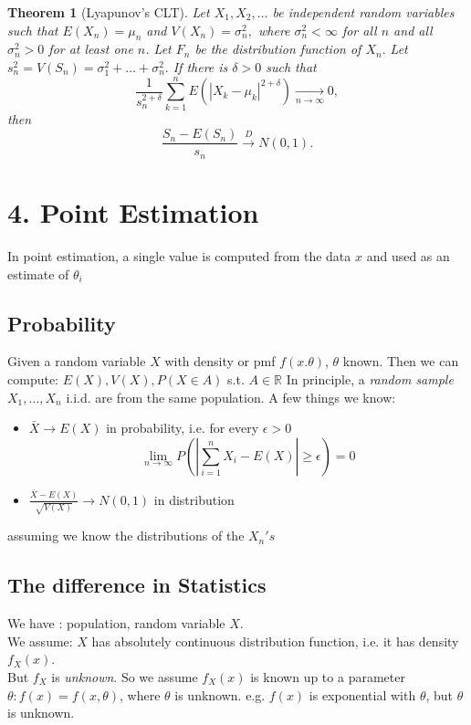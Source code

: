 \documentclass[12pt]{report} \addtolength{\textheight}{2in}
\newtheorem{thm}{Theorem}
\newcommand{\dto}{\overset{D}{\longrightarrow}}
\newcommand{\ntends}{\underset{n\to\infty}{\longrightarrow}}
\begin{document}
\begin{thm}[Lyapunov's CLT]
Let $X_1,X_2,\dots$ be independent random variables such that $E(X_n)=\mu_n$ and $V(X_n)=\sigma^2_n,$ where $\sigma^2_n < \infty$ for all $n$ and all $\sigma^2_n > 0$ for at least one $n$. Let $F_n$ be the distribution function of $X_n.$ Let $s_n^2=V(S_n)=\sigma^2_1+\dots+\sigma^2_n.$ If there is $\delta > 0$ such that 
\begin{displaymath}
\frac{1}{s_n^{2+\delta}}\sum_{k=1}^{n} E(|X_k-\mu_k|^{2+\delta}) \ntends 0,
\end{displaymath}
then
\begin{displaymath}
\frac{S_n-E(S_n)}{s_n}\dto N(0,1).
\end{displaymath}

\end{thm}

\section*{4. Point Estimation}
In point estimation, a single value is computed from the data $x$ and used as an estimate of $\theta_i$
\subsection*{Probability}
Given a random variable $X$ with density or pmf $f(x.\theta)$, $\theta$ known. Then we can compute: $E(X), V(X), P(X \in A)$ s.t. $A\in \mathbb{R}$
In principle, a \textit{random sample} $X_1,\dots,X_n$ i.i.d. are from the same population. A few things we know:
\begin{itemize}
\item $\bar{X} \to E(X)$ in probability, i.e. for every $\epsilon >0$
\begin{displaymath}
\lim_{n\to \infty}P(|\sum_{i=1}^{n}{X_i}-E(X)| \geq \epsilon) = 0
\end{displaymath}
\item $\frac{\bar{X}-E(X)}{\sqrt{V(X)}}\to N(0,1)$ in distribution
\end{itemize}
assuming we know the distributions of the $X_n's$
\subsection*{The difference in Statistics}
We have : population, random variable $X.$\\ 
We assume: $X$ has absolutely continuous distribution function, i.e. it has density $f_X(x)$.\\
But $f_X$ is \textit{unknown}. So we assume $f_X(x)$ is known up to a parameter $\theta: f(x)=f(x,\theta)$, where $\theta$ is unknown. e.g. $f(x)$ is exponential with $\theta$, but $\theta$ is unknown.
\end{document}
